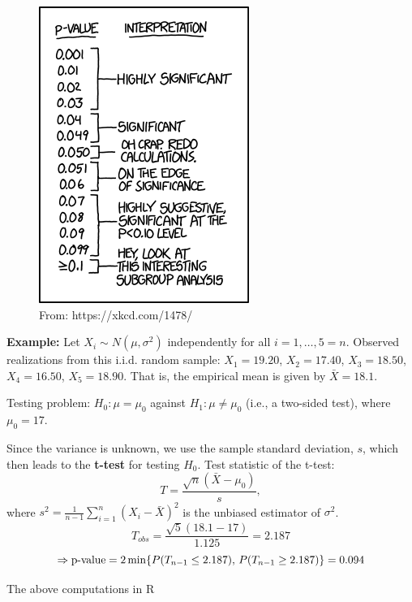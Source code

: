\documentclass[]{book}
\theoremstyle{definition}
\theoremstyle{definition}
\theoremstyle{definition}
\theoremstyle{remark}
\begin{document}
\begin{figure}

{\centering \includegraphics{img/xkcd_p_values} 

}

\caption{From: https://xkcd.com/1478/}\label{fig:pvalueFig}
\end{figure}

\textbf{Example:}
Let \(X_i\sim N(\mu,\sigma^2)\) independently for all \(i=1,\dots,5=n\). Observed realizations from this i.i.d. random sample: \(X_1=19.20\), \(X_2=17.40\), \(X_3=18.50\), \(X_4=16.50\), \(X_5=18.90\). That is, the empirical mean is given by \(\bar X =18.1\).

Testing problem: \(H_0:\mu=\mu_0\) against \(H_1:\mu\ne\mu_0\) (i.e., a two-sided test), where \(\mu_0=17\).

Since the variance is unknown, we use the sample standard deviation, \(s\), which then leads to the \textbf{t-test} for testing \(H_0\). Test statistic of the t-test:
\[T=\frac{\sqrt{n}(\bar X-\mu_0)}{s},\]
where \(s^2=\frac{1}{n-1}\sum_{i=1}^n (X_i-\bar X)^2\) is the unbiased estimator of \(\sigma^2\).
\[T_{obs}=\frac{\sqrt{5}(18.1-17)}{1.125}=2.187\]
\[\Rightarrow \hbox{p-value}=2\min\{P(T_{n-1}\leq 2.187),\, P(T_{n-1}\geq 2.187)\}=0.094\]

The above computations in R
\end{document}
